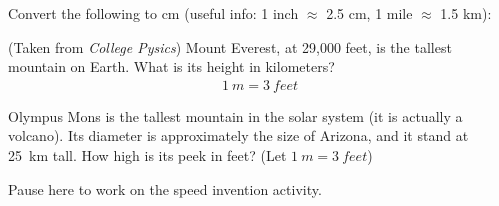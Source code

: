 \documentclass[12pt]{exam}
\begin{document}
\begin{questions}

\question
Convert the following to cm (useful info: 1 inch $\approx $ 2.5 cm, 1 mile $\approx$ 1.5 km):

\question
(Taken from \textit{College Pysics}) Mount Everest, at 29,000 feet, is the tallest mountain on Earth. What is its height in kilometers?
\begin{eqnarray}
	1~m = 3~feet
\end{eqnarray}
	\vspace{1in}

\question 
Olympus Mons is the tallest mountain in the solar system (it is actually a volcano). Its diameter is approximately the size of Arizona, and it stand at 25~km tall. How high is its peek in feet? (Let $1~m = 3~feet$)
\vspace{2in}

\begin{center}Pause here to work on the speed invention activity.\end{center}
\clearpage


\end{questions}
\end{document}
